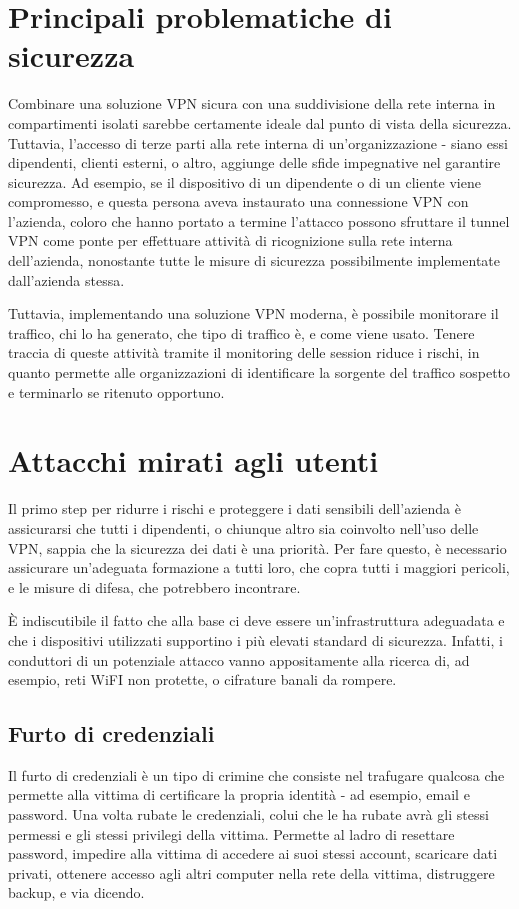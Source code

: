 \section{Principali problematiche di sicurezza}

Combinare una soluzione VPN sicura con una suddivisione della rete interna in compartimenti isolati sarebbe certamente ideale dal punto di vista della sicurezza.
Tuttavia, l'accesso di terze parti alla rete interna di un'organizzazione - siano essi dipendenti, clienti esterni, o altro, aggiunge delle sfide impegnative nel garantire sicurezza.
Ad esempio, se il dispositivo di un dipendente o di un cliente viene compromesso, e questa persona aveva instaurato una connessione VPN con l'azienda, coloro che hanno portato a termine l'attacco possono sfruttare il tunnel VPN come ponte per effettuare attività di ricognizione sulla rete interna dell'azienda, nonostante tutte le misure di sicurezza possibilmente implementate dall'azienda stessa.

Tuttavia, implementando una soluzione VPN moderna, è possibile monitorare il traffico, chi lo ha generato, che tipo di traffico è, e come viene usato. Tenere traccia di queste attività tramite il monitoring delle session riduce i rischi, in quanto permette alle organizzazioni di identificare la sorgente del traffico sospetto e terminarlo se ritenuto opportuno.

\section{Attacchi mirati agli utenti}

Il primo step per ridurre i rischi e proteggere i dati sensibili dell'azienda è assicurarsi che tutti i dipendenti, o chiunque altro sia coinvolto nell'uso delle VPN, sappia che la sicurezza dei dati è una priorità.
Per fare questo, è necessario assicurare un'adeguata formazione a tutti loro, che copra tutti i maggiori pericoli, e le misure di difesa, che potrebbero incontrare.

È indiscutibile il fatto che alla base ci deve essere un'infrastruttura adeguadata e che i dispositivi utilizzati supportino i più elevati standard di sicurezza. Infatti, i conduttori di un potenziale attacco vanno appositamente alla ricerca di, ad esempio, reti WiFI non protette, o cifrature banali da rompere.

\subsection{Furto di credenziali}
Il furto di credenziali è un tipo di crimine che consiste nel trafugare qualcosa che permette alla vittima di certificare la propria identità - ad esempio, email e password.
Una volta rubate le credenziali, colui che le ha rubate avrà gli stessi permessi e gli stessi privilegi della vittima.
Permette al ladro di resettare password, impedire alla vittima di accedere ai suoi stessi account, scaricare dati privati, ottenere accesso agli altri computer nella rete della vittima, distruggere backup, e via dicendo.

